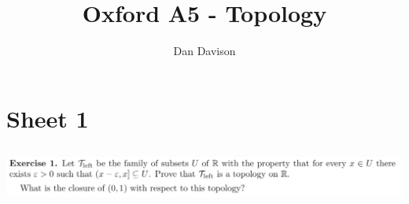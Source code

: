 \documentclass[12pt]{article}
\title{Oxford A5 - Topology
  \footnotetext{\url{https://courses.maths.ox.ac.uk/node/37667}}} \author{Dan Davison}
\author{}
\date{}
\begin{document}


\newpage
\section{Sheet 1}

\let\T\undefined
\newcommand{\T}{\mathcal T}
\newcommand{\Tleft}{\T_\text{left}}

\subsection{}
\begin{mdframed}
\includegraphics[width=400pt]{img/oxford-a5-1-1.png}
\end{mdframed}
\end{document}
